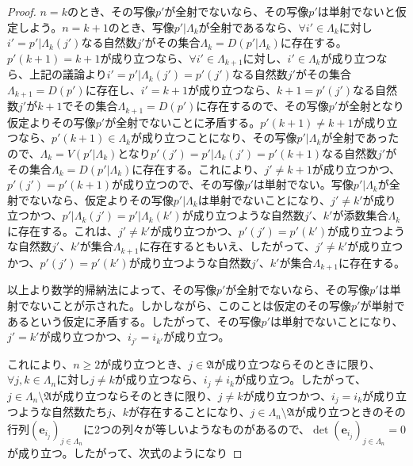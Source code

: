 \documentclass[dvipdfmx]{jsarticle}
\begin{document}
\begin{proof}
$n = k$のとき、その写像$p'$が全射でないなら、その写像$p'$は単射でないと仮定しよう。$n = k + 1$のとき、写像$p'|\varLambda_{k}$が全射であるなら、$\forall i' \in \varLambda_{k}$に対し$i' = p'|\varLambda_{k}\left( j' \right)$なる自然数$j'$がその集合$\varLambda_{k} = D\left( p'|\varLambda_{k} \right)$に存在する。$p'(k + 1) = k + 1$が成り立つなら、$\forall i' \in \varLambda_{k + 1}$に対し、$i' \in \varLambda_{k}$が成り立つなら、上記の議論より$i' = p'|\varLambda_{k}\left( j' \right) = p'\left( j' \right)$なる自然数$j'$がその集合$\varLambda_{k + 1} = D\left( p' \right)$に存在し、$i' = k + 1$が成り立つなら、$k + 1 = p'\left( j' \right)$なる自然数$j'$が$k + 1$でその集合$\varLambda_{k + 1} = D\left( p' \right)$に存在するので、その写像$p'$が全射となり仮定よりその写像$p'$が全射でないことに矛盾する。$p'(k + 1) \neq k + 1$が成り立つなら、$p'(k + 1) \in \varLambda_{k}$が成り立つことになり、その写像$p'|\varLambda_{k}$が全射であったので、$\varLambda_{k} = V\left( p'|\varLambda_{k} \right)$となり$p'\left( j' \right) = p'|\varLambda_{k}\left( j' \right) = p'(k + 1)$なる自然数$j'$がその集合$\varLambda_{k} = D\left( p'|\varLambda_{k} \right)$に存在する。これにより、$j' \neq k + 1$が成り立つかつ、$p'\left( j' \right) = p'(k + 1)$が成り立つので、その写像$p'$は単射でない。写像$p'|\varLambda_{k}$が全射でないなら、仮定よりその写像$p'|\varLambda_{k}$は単射でないことになり、$j' \neq k'$が成り立つかつ、$p'|\varLambda_{k}\left( j' \right) = p'|\varLambda_{k}\left( k' \right)$が成り立つような自然数$j'$、$k'$が添数集合$\varLambda_{k}$に存在する。これは、$j' \neq k'$が成り立つかつ、$p'\left( j' \right) = p'\left( k' \right)$が成り立つような自然数$j'$、$k'$が集合$\varLambda_{k + 1}$に存在するともいえ、したがって、$j' \neq k'$が成り立つかつ、$p'\left( j' \right) = p'\left( k' \right)$が成り立つような自然数$j'$、$k'$が集合$\varLambda_{k + 1}$に存在する。\par
以上より数学的帰納法によって、その写像$p'$が全射でないなら、その写像$p'$は単射でないことが示された。しかしながら、このことは仮定のその写像$p'$が単射であるという仮定に矛盾する。したがって、その写像$p'$は単射でないことになり、$j' = k'$が成り立つかつ、$i_{j'} = i_{k'}$が成り立つ。\par
これにより、$n \geq 2$が成り立つとき、$j \in \mathfrak{A}$が成り立つならそのときに限り、$\forall j,k \in \varLambda_{n}$に対し$j \neq k$が成り立つなら、$i_{j} \neq i_{k}$が成り立つ。したがって、$j \in \varLambda_{n}\mathfrak{\setminus A}$が成り立つならそのときに限り、$j \neq k$が成り立つかつ、$i_{j} = i_{k}$が成り立つような自然数たち$j$、$k$が存在することになり、$j \in \varLambda_{n}\mathfrak{\setminus A}$が成り立つときのその行列$\left( \mathbf{e}_{i_{j}} \right)_{j \in \varLambda_{n}}$に2つの列々が等しいようなものがあるので、$\det\left( \mathbf{e}_{i_{j}} \right)_{j \in \varLambda_{n}} = 0$が成り立つ。したがって、次式のようになり

\end{proof}
\end{document}
